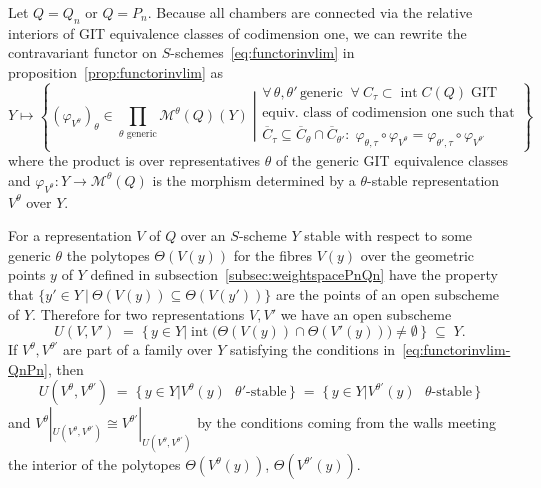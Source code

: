 \documentclass[10pt,a4paper]{amsart}
\theoremstyle{definition}
\def\phi{\varphi}
\DeclareMathOperator{\interior}{int}
\begin{document}
Let $Q\!=\!Q_n$ or $Q\!=\!P_n$. Because all chambers are connected via the 
relative interiors of GIT equivalence classes of codimension one, we can rewrite 
the contravariant functor on $S$-schemes~\eqref{eq:functorinvlim} in 
proposition~\ref{prop:functorinvlim} as
\begin{equation}\label{eq:functorinvlim-QnPn}
Y\mapsto
\left\{\left.
(\phi_{V^\theta})_\theta\in\!\!\!\!\!\prod_{\text{$\theta$ generic}}\!\!\!\!\!
\mathcal M^\theta(Q)(Y)
\;\right|\!
\begin{array}{l}
\forall\,\theta,\theta'\,\text{generic}\;\;
\forall\:C_\tau\subset\interior C(Q)\;\text{GIT}\\
\text{equiv.\ class of codimension one such that}\\
\overline{C}_\tau\subseteq\overline{C}_\theta\cap\overline{C}_{\theta'}\colon
\;\phi_{\theta,\tau}\circ\phi_{V^{\theta}}=\phi_{\theta',\tau}\circ\phi_{V^{\theta'}}
\end{array}\!
\right\}
\end{equation}
where the product is over representatives $\theta$ of the generic GIT equivalence classes
and $\phi_{V^\theta}\colon Y\to\mathcal M^\theta(Q)$ is the morphism determined by a
$\theta$-stable representation $V^\theta$ over $Y$.


For a representation $V$ of $Q$ over an $S$-scheme $Y$ stable with respect 
to some generic $\theta$ the polytopes $\Theta(V(y))$ for the fibres $V(y)$ 
over the geometric points $y$ of $Y$ defined in subsection~\ref{subsec:weightspacePnQn} 
have the property that $\{y'\in Y\:|\:\Theta(V(y))\subseteq \Theta(V(y'))\}$ are 
the points of an open subscheme of $Y$. Therefore for two representations $V,V'$ 
we have an open subscheme
\[
U(V,V')\;=\;\big\{\,y\in Y \mathbin{\big|}\interior\big(\Theta(V(y))\cap\Theta(V'(y))\big)
\neq\emptyset\,\big\}\;\subseteq \;Y.
\]
If $V^\theta,V^{\theta'}\!$ are part of a family over $Y$ satisfying the conditions
in~\eqref{eq:functorinvlim-QnPn}, then 
\[
U(V^\theta,V^{\theta'})
\;=\;\big\{\,y\in Y\mathbin{\big|}\text{$V^\theta(y)$ $\theta'$-stable}\,\big\}
\;=\;\big\{\,y\in Y\mathbin{\big|}\text{$V^{\theta'}\!(y)$ $\theta$-stable}\,\big\}
\] 
and $V^\theta|_{U(V^\theta,V^{\theta'})}\cong V^{\theta'}|_{U(V^\theta,V^{\theta'})}$
by the conditions coming from the walls meeting the interior of the polytopes
$\Theta(V^\theta(y))$, $\Theta(V^{\theta'}\!(y))$.

\end{document}

